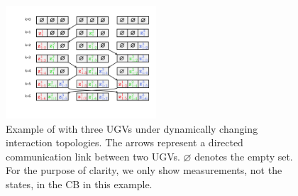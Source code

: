 	\begin{figure}%
		\centering
		\includegraphics[width=0.5\textwidth]{figures/fifo}
		\caption{Example of {\proto} with three UGVs under dynamically changing interaction topologies. The arrows represent a directed communication link between two UGVs. $\varnothing$ denotes the empty set. For the purpose of clarity, we only show measurements, not the states, in the CB in this example.}
		\label{fig:\proto}
	\end{figure}		